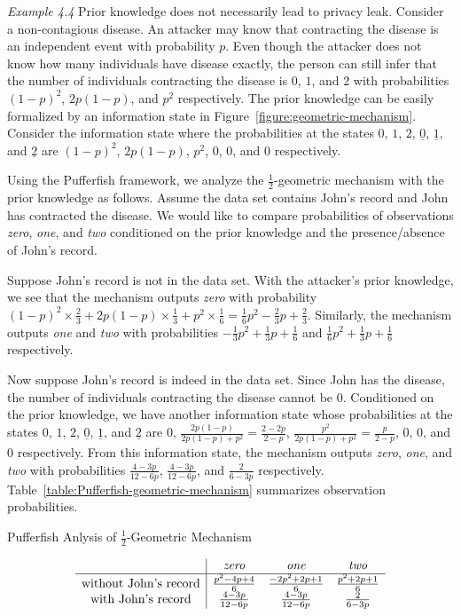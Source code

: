 \noindent
\textit{Example 4.4}
Prior knowledge does not necessarily lead to privacy leak. Consider a
non-contagious disease. An attacker may know that contracting the
disease is an independent event with probability $p$. Even though the
attacker does not know how many individuals have disease exactly, the
person can still infer that the number of individuals contracting the
disease is $0$, $1$, and $2$ with probabilities $(1-p)^2$, $2p(1-p)$,
and $p^2$ respectively. The prior knowledge can be easily formalized
by an information state in Figure~\ref{figure:geometric-mechanism}.
Consider the information
state where the probabilities at the states $0$, $1$, $2$,
$\underline{0}$, $\underline{1}$, and $\underline{2}$ are $(1-p)^2$,
$2p(1-p)$, $p^2$, $0$, $0$, and $0$ respectively.

Using the Pufferfish framework, we analyze the $\frac{1}{2}$-geometric
mechanism with the prior knowledge as follows. Assume the data set
contains John's record and John has contracted the disease. We would
like to compare probabilities of observations \textit{zero},
\textit{one}, and \textit{two} conditioned on the prior knowledge and
the presence/absence of John's record.

Suppose John's record is not in the data set. With the attacker's
prior knowledge, we see that the mechanism outputs \textit{zero} with
probability $(1-p)^2 \times \frac{2}{3} + 2p(1-p) \times \frac{1}{3} +
p^2 \times \frac{1}{6} = \frac{1}{6} p^2 - \frac{2}{3} p +
\frac{2}{3}$. Similarly, the mechanism outputs \textit{one} and
\textit{two} with probabilities $-\frac{1}{3} p^2 + \frac{1}{3} p +
\frac{1}{6}$ and $\frac{1}{6} p^2 + \frac{1}{3} p + \frac{1}{6}$
respectively.

Now suppose John's record is indeed in the data set. Since John has
the disease, the number of individuals contracting the disease cannot
be $0$. Conditioned on the prior knowledge, we have another
information state whose probabilities at the states $0$, $1$, $2$,
$\underline{0}$, $\underline{1}$, and $\underline{2}$ are $0$,
$\frac{2p(1-p)}{2p(1-p) + p^2} = \frac{2-2p}{2-p}$,
$\frac{p^2}{2p(1-p) + p^2} = \frac{p}{2-p}$, $0$, $0$, and $0$
respectively. From this information state, the mechanism outputs
\textit{zero}, \textit{one}, and \textit{two} with probabilities
$\frac{4-3p}{12-6p}$, $\frac{4-3p}{12-6p}$, and $\frac{2}{6-3p}$
respectively. Table~\ref{table:Pufferfish-geometric-mechanism}
summarizes observation probabilities.

\begin{table}
  \caption{Pufferfish Anlysis of $\frac{1}{2}$-Geometric Mechanism}
  \label{table:Pufferfish-geometric-mechanism}
  \centering
  \[
    \begin{array}{c|ccc}
      & \textit{zero} & \textit{one} & \textit{two} \\
      \hline
      \textmd{without John's record}
      & \frac{p^2 - 4p + 4}{6}
      & \frac{-2p^2 + 2p + 1}{6}
      & \frac{p^2 + 2p + 1}{6}
      \\

      \textmd{with John's record}
      & \frac{4-3p}{12-6p}
      & \frac{4-3p}{12-6p}
      & \frac{2}{6-3p}
    \end{array}
  \]
\end{table}

